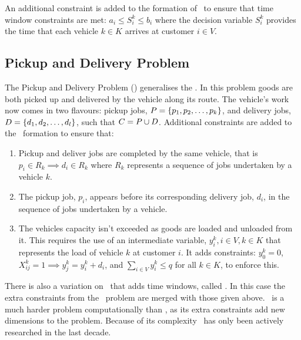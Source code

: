 An additional constraint is added to the formation of \CVRP\ to ensure that time window constraints are met: $a_i \leq S_i^k \leq b_i$ where the decision variable $S_i^k$ provides the time that each vehicle $k \in K$ arrives at customer $i \in V$.

\subsection{Pickup and Delivery Problem}

The Pickup and Delivery Problem (\PDP) generalises the \VRP. In this problem goods are both picked up and delivered by the vehicle along its route. The vehicle's work now comes in two flavours: pickup jobs, $P = \{p_1,p_2,\ldots,p_k\}$, and delivery jobs, $D = \{d_1,d_2,\ldots,d_l\}$, such that $C = P \cup D$. Additional constraints are added to the \CVRP\ formation to ensure that:

\begin{enumerate}
   \item Pickup and deliver jobs are completed by the same vehicle, that is $p_i \in R_k \implies d_i \in R_k$ where $R_k$ represents a sequence of jobs undertaken by a vehicle $k$.

   \item The pickup job, $p_i$, appears before its corresponding delivery job, $d_i$, in the sequence of jobs undertaken by a vehicle.

   \item The vehicles capacity isn't exceeded as goods are loaded and unloaded from it. This requires the use of an intermediate variable, $y^k_i, i \in V, k \in K$ that represents the load of vehicle $k$ at customer $i$. It adds constraints: $y^k_0 = 0$, $X_{ij}^k = 1 \implies y^k_j = y^k_i + d_i$, and $\sum_{i \in V} y^k_i \leq q$ for all $k \in K$, to enforce this.
   
\end{enumerate}

There is also a variation on \PDP\ that adds time windows, called \PDPTW. In this case the extra constraints from the \VRPTW\ problem are merged with those given above. \PDP\ is a much harder problem computationally than \CVRP, as its extra constraints add new dimensions to the problem. Because of its complexity \PDP\ has only been actively researched in the last decade. 


